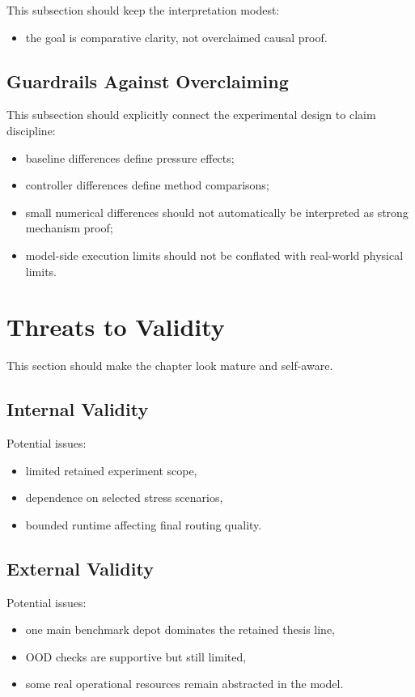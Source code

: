 This subsection should keep the interpretation modest:
\begin{itemize}
    \item the goal is comparative clarity, not overclaimed causal proof.
\end{itemize}

\subsection{Guardrails Against Overclaiming}

This subsection should explicitly connect the experimental design to claim discipline:
\begin{itemize}
    \item baseline differences define pressure effects;
    \item controller differences define method comparisons;
    \item small numerical differences should not automatically be interpreted as strong mechanism proof;
    \item model-side execution limits should not be conflated with real-world physical limits.
\end{itemize}

\section{Threats to Validity}

This section should make the chapter look mature and self-aware.

\subsection{Internal Validity}

Potential issues:
\begin{itemize}
    \item limited retained experiment scope,
    \item dependence on selected stress scenarios,
    \item bounded runtime affecting final routing quality.
\end{itemize}

\subsection{External Validity}

Potential issues:
\begin{itemize}
    \item one main benchmark depot dominates the retained thesis line,
    \item OOD checks are supportive but still limited,
    \item some real operational resources remain abstracted in the model.
\end{itemize}

